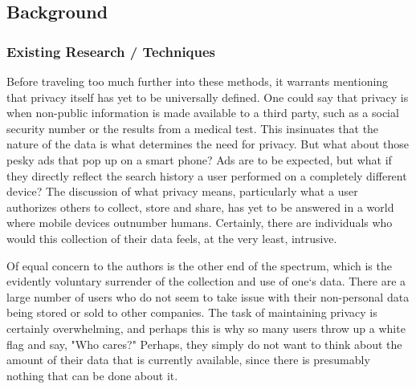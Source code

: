 \documentclass[10pt,journal,compsoc]{IEEEtran}
\begin{document}


\hfill 
 
\hfill 

\subsection{Background}


\subsubsection{Existing Research / Techniques}

	Before traveling too much further into these methods, it warrants mentioning that privacy itself has yet to be universally defined. One could say that privacy is when non-public information is made available to a third party, such as a social security number or the results from a medical test.  This insinuates that the nature of the data is what determines the need for privacy.  But what about those pesky ads that pop up on a smart phone?  Ads are to be expected, but what if they directly reflect the search history a user performed on a completely different device?  The discussion of what privacy means, particularly what a user authorizes others to collect, store and share, has yet to be answered in a world where mobile devices outnumber humans\cite{borne}. Certainly, there are individuals who would this collection of their data feels, at the very least, intrusive.
	
	Of equal concern to the authors is the other end of the spectrum, which is the evidently voluntary surrender of the collection and use of one`s data.  There are a large number of users who do not seem to take issue with their non-personal data being stored or sold to other companies.  The task of maintaining privacy is certainly overwhelming, and perhaps this is why so many users throw up a white flag and say, "Who cares?"  Perhaps, they simply do not want to think about the amount of their data that is currently available, since there is presumably nothing that can be done about it.
	
\end{document}
